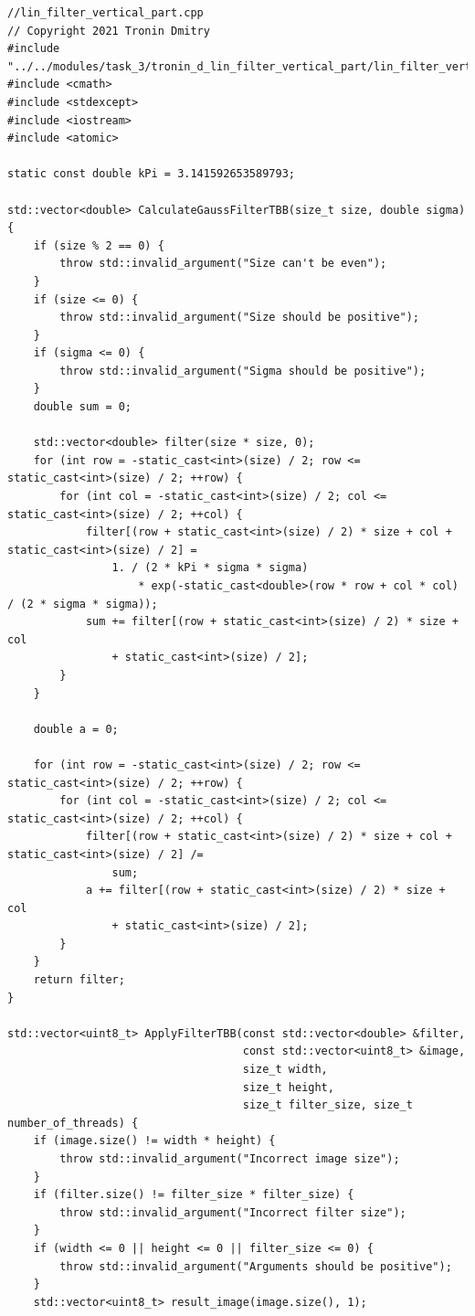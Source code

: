\documentclass{report}
\begin{document}
\begin{lstlisting}[breaklines=true]
//lin_filter_vertical_part.cpp
// Copyright 2021 Tronin Dmitry
#include "../../modules/task_3/tronin_d_lin_filter_vertical_part/lin_filter_vertical_part.h"
#include <cmath>
#include <stdexcept>
#include <iostream>
#include <atomic>

static const double kPi = 3.141592653589793;

std::vector<double> CalculateGaussFilterTBB(size_t size, double sigma) {
    if (size % 2 == 0) {
        throw std::invalid_argument("Size can't be even");
    }
    if (size <= 0) {
        throw std::invalid_argument("Size should be positive");
    }
    if (sigma <= 0) {
        throw std::invalid_argument("Sigma should be positive");
    }
    double sum = 0;

    std::vector<double> filter(size * size, 0);
    for (int row = -static_cast<int>(size) / 2; row <= static_cast<int>(size) / 2; ++row) {
        for (int col = -static_cast<int>(size) / 2; col <= static_cast<int>(size) / 2; ++col) {
            filter[(row + static_cast<int>(size) / 2) * size + col + static_cast<int>(size) / 2] =
                1. / (2 * kPi * sigma * sigma)
                    * exp(-static_cast<double>(row * row + col * col) / (2 * sigma * sigma));
            sum += filter[(row + static_cast<int>(size) / 2) * size + col
                + static_cast<int>(size) / 2];
        }
    }

    double a = 0;

    for (int row = -static_cast<int>(size) / 2; row <= static_cast<int>(size) / 2; ++row) {
        for (int col = -static_cast<int>(size) / 2; col <= static_cast<int>(size) / 2; ++col) {
            filter[(row + static_cast<int>(size) / 2) * size + col + static_cast<int>(size) / 2] /=
                sum;
            a += filter[(row + static_cast<int>(size) / 2) * size + col
                + static_cast<int>(size) / 2];
        }
    }
    return filter;
}

std::vector<uint8_t> ApplyFilterTBB(const std::vector<double> &filter,
                                    const std::vector<uint8_t> &image,
                                    size_t width,
                                    size_t height,
                                    size_t filter_size, size_t number_of_threads) {
    if (image.size() != width * height) {
        throw std::invalid_argument("Incorrect image size");
    }
    if (filter.size() != filter_size * filter_size) {
        throw std::invalid_argument("Incorrect filter size");
    }
    if (width <= 0 || height <= 0 || filter_size <= 0) {
        throw std::invalid_argument("Arguments should be positive");
    }
    std::vector<uint8_t> result_image(image.size(), 1);


\end{lstlisting}
\end{document}
